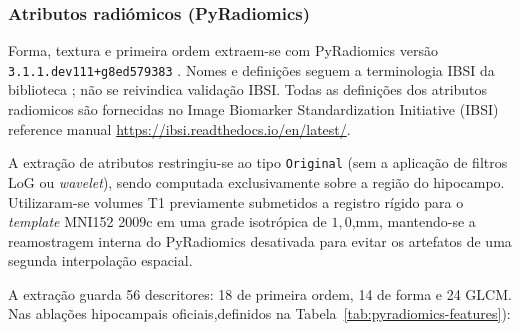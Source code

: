 \documentclass[review]{elsarticle}
\newcommand{\code}[1]{\texttt{#1}}
\begin{document}
	\subsubsection{Atributos radiómicos (PyRadiomics)}\label{subsubsec:radiomics}
	
	Forma, textura e primeira ordem extraem-se com PyRadiomics versão \code{3.1.1.dev111+g8ed579383} \cite{griethuysen-2017}.
	Nomes e definições seguem a terminologia IBSI da biblioteca \cite{zwanenburg-2020}; não se reivindica validação IBSI. Todas as definições dos atributos radiomicos são fornecidas no Image Biomarker Standardization Initiative (IBSI) reference manual \url{https://ibsi.readthedocs.io/en/latest/}.
	
	A extração de atributos restringiu-se ao tipo \code{Original} (sem a aplicação de filtros LoG ou \emph{wavelet}), sendo computada exclusivamente sobre a região do hipocampo. Utilizaram-se volumes T1 previamente submetidos a registro rígido para o \emph{template} MNI152 2009c em uma grade isotrópica de $1{,}0$,mm, mantendo-se a reamostragem interna do PyRadiomics desativada para evitar os artefatos de uma segunda interpolação espacial.
	
	A extração guarda 56 descritores: 18 de primeira ordem, 14 de forma e 24 GLCM.
	Nas ablações hipocampais oficiais,definidos na Tabela~\ref{tab:pyradiomics-features}):
	
\end{document}
